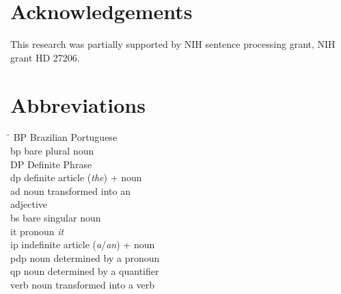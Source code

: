 \documentclass[output=paper,
modfonts
]{langscibook}
\begin{document}
     
\section*{Acknowledgements}
This research was partially supported by NIH sentence processing grant, NIH grant HD 27206.

\section*{Abbreviations}
\begin{multicols}{2}
\begin{tabbing}
	\hspace{2.5em} \= \kill 
	BP \> Brazilian Portuguese \\
	bp \>  bare plural noun \\
	DP \>  Definite Phrase \\
	dp \>  definite article (\textit{the}) + noun \\
	ad \>  noun transformed into an\\\> adjective \\
	bs \>  bare singular noun \\
	it \>  pronoun \textit{it} \\
	ip \>  indefinite article (\textit{a}/\textit{an}) + noun \\
	pdp \>  noun determined by a pronoun \\
	qp \>  noun determined by a quantifier \\
	verb \>  noun transformed into a verb
\end{tabbing}
\end{multicols}

{\sloppy\printbibliography[heading=subbibliography,notkeyword=this]}
\end{document}
